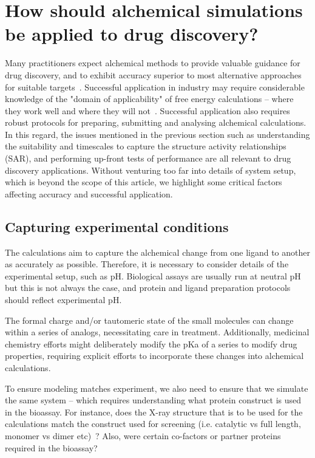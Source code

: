 \documentclass[9pt,bestpractices]{livecoms}
\begin{document}
\section{How should alchemical simulations be applied to drug discovery?}
\label{sec:drugdiscovery}
%
Many practitioners expect alchemical methods to provide valuable guidance for drug discovery, and to exhibit accuracy superior to most  alternative approaches for suitable targets~\cite{kuhn2017prospective}. Successful application in industry may require considerable knowledge of the "domain of applicability" of free energy calculations -- where they work well and where they will not~\cite{sherborne2016collaborating}. Successful application also requires robust protocols for preparing, submitting and analysing alchemical calculations. In this regard, the issues mentioned in the previous section such as understanding the suitability and timescales to capture the structure activity relationships (SAR), and performing up-front tests of performance are all relevant to drug discovery applications. Without venturing too far into details of system setup, which is beyond the scope of this article, we highlight some critical factors affecting accuracy and successful application. 
%
\subsection{Capturing experimental conditions}
The calculations aim to capture the alchemical change from one ligand to another as accurately as possible. Therefore, it is necessary to consider details of the experimental setup, such as pH. Biological assays are usually run at neutral pH but this is not always the case, and protein and ligand preparation protocols should reflect experimental pH. 

The formal charge and/or tautomeric state of the small molecules can change within a series of analogs, necessitating care in treatment. Additionally, medicinal chemistry efforts might deliberately modify the pKa of a series to modify drug properties, requiring explicit efforts to incorporate these changes into alchemical calculations.

To ensure modeling matches experiment, we also need to ensure that we simulate the same system -- which requires understanding what protein construct is used in the bioassay. For instance, does the X-ray structure that is to be used for the calculations match the construct used for screening (i.e. catalytic vs full length, monomer vs dimer etc)~\cite{perez-benito2018predicting}? Also, were certain co-factors or partner proteins required in the bioassay? 
%
\end{document}
